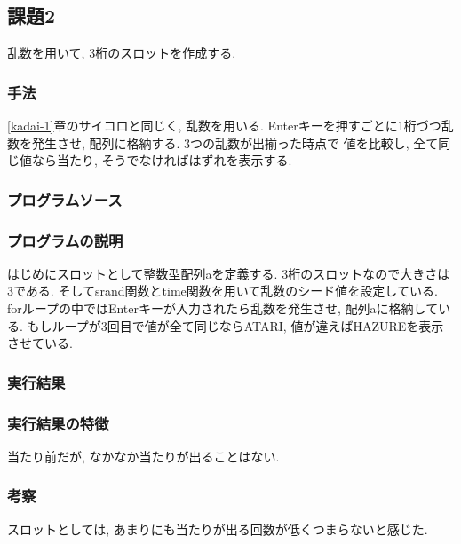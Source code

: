 \documentclass{jsarticle}
\begin{document}
        
                
        
            
        
        \subsection{課題2}
            乱数を用いて, 3桁のスロットを作成する. 
            \subsubsection{手法}
                \ref{kadai-1}章のサイコロと同じく, 乱数を用いる. 
                Enterキーを押すごとに1桁づつ乱数を発生させ, 配列に格納する. 3つの乱数が出揃った時点で
                値を比較し, 全て同じ値なら当たり, そうでなければはずれを表示する. 
            \subsubsection{プログラムソース}
                
            
            \subsubsection{プログラムの説明}
                はじめにスロットとして整数型配列aを定義する. 3桁のスロットなので大きさは3である. 
                そしてsrand関数とtime関数を用いて乱数のシード値を設定している. \\
                forループの中ではEnterキーが入力されたら乱数を発生させ, 配列aに格納している. 
                もしループが3回目で値が全て同じならATARI, 値が違えばHAZUREを表示させている. 
            
            \subsubsection{実行結果}
                
            
            \subsubsection{実行結果の特徴}
                当たり前だが, なかなか当たりが出ることはない. 
            \subsubsection{考察}
                スロットとしては, あまりにも当たりが出る回数が低くつまらないと感じた. 
            
\end{document}
